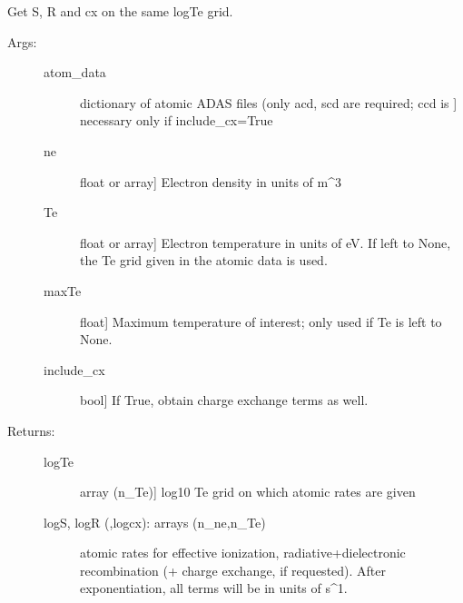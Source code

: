 \documentclass[letterpaper,10pt,english]{sphinxmanual}
\begin{document}
\begin{fulllineitems}
\label{\detokenize{aurora:aurora.atomic.get_cs_balance_terms}}
Get S, R and cx on the same logTe grid.
\begin{description}
\item[{Args:}] \leavevmode\begin{description}
\item[{atom\_data}] \leavevmode{[}dictionary of atomic ADAS files (only acd, scd are required; ccd is {]}
necessary only if include\_cx=True

\item[{ne}] \leavevmode{[}float or array{]}
Electron density in units of m\textasciicircum{}\sphinxhyphen{}3

\item[{Te}] \leavevmode{[}float or array{]}
Electron temperature in units of eV. If left to None, the Te grid
given in the atomic data is used.

\item[{maxTe}] \leavevmode{[}float{]}
Maximum temperature of interest; only used if Te is left to None.

\item[{include\_cx}] \leavevmode{[}bool{]}
If True, obtain charge exchange terms as well.

\end{description}

\item[{Returns:}] \leavevmode\begin{description}
\item[{logTe}] \leavevmode{[}array (n\_Te){]}
log10 Te grid on which atomic rates are given

\item[{logS, logR (,logcx): arrays (n\_ne,n\_Te)}] \leavevmode
atomic rates for effective ionization, radiative+dielectronic
recombination (+ charge exchange, if requested). After exponentiation, all terms
will be in units of s\textasciicircum{}\sphinxhyphen{}1.

\end{description}

\end{description}

\end{fulllineitems}
\end{document}
